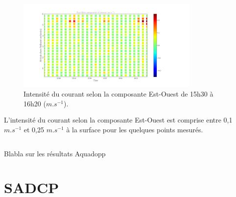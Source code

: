 \documentclass[12pt]{article}
\begin{document}
\begin{figure}[!ht]
	\begin{center}
		\includegraphics[width=0.8\textwidth]{18032102scatterv1.png}
		\caption{Intensité du courant selon la composante Est-Ouest de 15h30 à 16h20 ($m.s^{-1}$).}
	\end{center}
\end{figure}
L'intensité du courant selon la composante Est-Ouest est comprise entre 0,1 $m.s^{-1}$ et 0,25 $m.s^{-1}$ à la surface pour les quelques points mesurés.\\

\subsection{}
Blabla sur les résultats Aquadopp

\section{SADCP}
\end{document}
